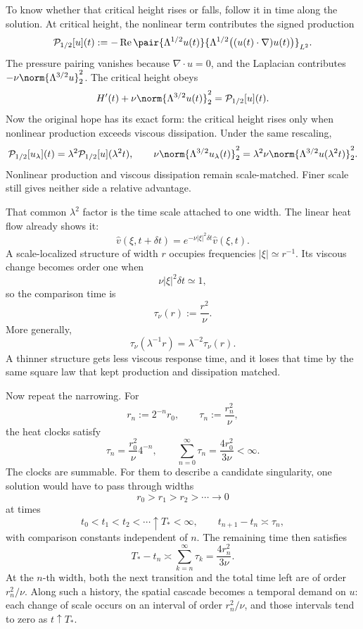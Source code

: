 
To know whether that critical height rises or falls, follow it in time along the solution. At critical height, the nonlinear term contributes the signed production
\[
  \mathcal P_{1/2}[u](t)
  :=
  -\operatorname{Re}
  \pair
    {\Lambda^{1/2}u(t)}
    {\Lambda^{1/2}\bigl((u(t)\cdot\nabla)u(t)\bigr)}_{L^2}.
\]
The pressure pairing vanishes because \(\nabla\cdot u=0\), and the Laplacian contributes \(-\nu\norm{\Lambda^{3/2}u}_2^2\). The critical height obeys
\[
  H'(t)
  +
  \nu\norm{\Lambda^{3/2}u(t)}_2^2
  =
  \mathcal P_{1/2}[u](t).
\]
Now the original hope has its exact form: the critical height rises only when nonlinear production exceeds viscous dissipation. Under the same rescaling,
\[
  \mathcal P_{1/2}[u_\lambda](t)
  =
  \lambda^2\mathcal P_{1/2}[u](\lambda^2t),
  \qquad
  \nu\norm{\Lambda^{3/2}u_\lambda(t)}_2^2
  =
  \lambda^2\nu\norm{\Lambda^{3/2}u(\lambda^2t)}_2^2.
\]
Nonlinear production and viscous dissipation remain scale-matched. Finer scale still gives neither side a relative advantage.


That common \(\lambda^2\) factor is the time scale attached to one width. The linear heat flow already shows it:
\[
  \widehat v(\xi,t+\delta t)
  =
  e^{-\nu|\xi|^2\delta t}\widehat v(\xi,t).
\]
A scale-localized structure of width \(r\) occupies frequencies \(|\xi|\simeq r^{-1}\). Its viscous change becomes order one when
\[
  \nu|\xi|^2\delta t\simeq1,
\]
so the comparison time is
\[
  \tau_\nu(r)
  :=
  \frac{r^2}{\nu}.
\]
More generally,
\[
  \tau_\nu(\lambda^{-1}r)
  =
  \lambda^{-2}\tau_\nu(r).
\]
A thinner structure gets less viscous response time, and it loses that time by the same square law that kept production and dissipation matched.


Now repeat the narrowing. For
\[
  r_n:=2^{-n}r_0,
  \qquad
  \tau_n:=\frac{r_n^2}{\nu},
\]
the heat clocks satisfy
\[
  \tau_n
  =
  \frac{r_0^2}{\nu}4^{-n},
  \qquad
  \sum_{n=0}^{\infty}\tau_n
  =
  \frac{4r_0^2}{3\nu}
  <
  \infty.
\]
The clocks are summable. For them to describe a candidate singularity, one \NavierStokes{} solution would have to pass through widths
\[
  r_0>r_1>r_2>\cdots\longrightarrow0
\]
at times
\[
  t_0<t_1<t_2<\cdots\uparrow T_*<\infty,
  \qquad
  t_{n+1}-t_n\asymp\tau_n,
\]
with comparison constants independent of \(n\). The remaining time then satisfies
\[
  T_*-t_n
  \asymp
  \sum_{k=n}^{\infty}\tau_k
  =
  \frac{4r_n^2}{3\nu}.
\]
At the \(n\)-th width, both the next transition and the total time left are of order \(r_n^2/\nu\). Along such a history, the spatial cascade becomes a temporal demand on \(u\): each change of scale occurs on an interval of order \(r_n^2/\nu\), and those intervals tend to zero as \(t\uparrow T_*\).
